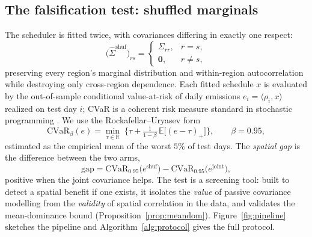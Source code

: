 \documentclass[10pt,twocolumn]{article}
\newcommand{\CVaR}{\mathrm{CVaR}}
\newcommand{\R}{\mathbb{R}}
\newcommand{\E}{\mathbb{E}}
\begin{document}
\subsection{The falsification test: shuffled marginals}\label{sec:test}
The scheduler is fitted twice, with covariances differing in exactly one respect:
\begin{equation}
\big(\hat\Sigma^{\mathrm{shuf}}\big)_{rs}=
\begin{cases}
\Sigma_{rr}, & r=s,\\
\mathbf{0}, & r\neq s,
\end{cases}
\label{eq:shuf}
\end{equation}
preserving every region's marginal distribution and within-region autocorrelation
while destroying only cross-region dependence. Each fitted schedule $x$ is evaluated
by the out-of-sample conditional value-at-risk of daily emissions
$e_i=\langle\rho_i,x\rangle$ realized on test day $i$; CVaR is a coherent risk
measure \citep{artzner1999} standard in stochastic programming
\citep{shapiro2009}. We use the Rockafellar--Uryasev form \citep{rockafellar2000}
\begin{equation}
\CVaR_{\beta}(e)=\min_{\tau\in\R}\;\Big\{\tau+\tfrac{1}{1-\beta}\,
\E\big[(e-\tau)_+\big]\Big\},
\qquad\beta=0.95,
\label{eq:cvar}
\end{equation}
estimated as the empirical mean of the worst $5\%$ of test days. The \emph{spatial
gap} is the difference between the two arms,
\begin{equation}
\mathrm{gap}=\CVaR_{0.95}\big(e^{\mathrm{shuf}}\big)-
\CVaR_{0.95}\big(e^{\mathrm{joint}}\big),
\label{eq:gap}
\end{equation}
positive when the joint covariance helps. The test is a screening tool: built to
detect a spatial benefit if one exists, it isolates the \emph{value} of passive
covariance modelling from the \emph{validity} of spatial correlation in the data, and
validates the mean-dominance bound (Proposition~\ref{prop:meandom}).
Figure~\ref{fig:pipeline} sketches the pipeline and Algorithm~\ref{alg:protocol}
gives the full protocol.
\end{document}
